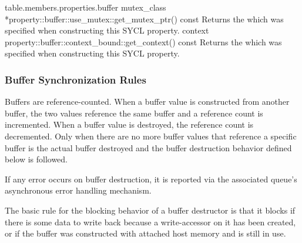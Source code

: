 {table.members.properties.buffer}
\addRow
{mutex_class *property::buffer::use_mutex::get_mutex_ptr() const}
{
  Returns the  which was specified when
  constructing this SYCL  property.
}
\addRow
{context property::buffer::context_bound::get_context() const}
{
  Returns the  which was specified when
  constructing this SYCL  property.
}
\completeTable

\subsubsection{Buffer Synchronization Rules}
\label{sec:buf-sync-rules}

Buffers are reference-counted. When a buffer value is constructed
from another buffer, the two values reference the same buffer and a
reference count is incremented. When a buffer value is destroyed,
the reference count is decremented. Only when there are no more
buffer values that reference a specific buffer is the actual
buffer destroyed and the buffer destruction behavior defined
below is followed.

If any error occurs on buffer destruction, it is reported
via the associated queue's asynchronous error handling mechanism.

The basic rule for the blocking behavior of a buffer destructor is
that it blocks if there is some data to write back because a
write-accessor on it has been created, or if the buffer was constructed
with attached host memory and is still in use.

